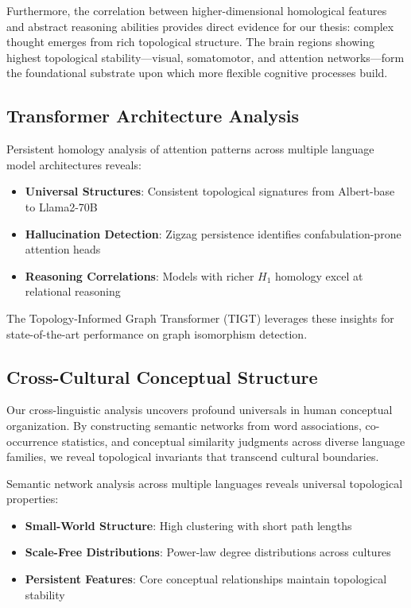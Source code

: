 \documentclass[11pt]{article}
\begin{document}
Furthermore, the correlation between higher-dimensional homological features and abstract reasoning abilities provides direct evidence for our thesis: complex thought emerges from rich topological structure. The brain regions showing highest topological stability—visual, somatomotor, and attention networks—form the foundational substrate upon which more flexible cognitive processes build.

\subsection{Transformer Architecture Analysis}

Persistent homology analysis of attention patterns across multiple language model architectures reveals:

\begin{itemize}
\item \textbf{Universal Structures}: Consistent topological signatures from Albert-base to Llama2-70B
\item \textbf{Hallucination Detection}: Zigzag persistence identifies confabulation-prone attention heads
\item \textbf{Reasoning Correlations}: Models with richer $H_1$ homology excel at relational reasoning
\end{itemize}

The Topology-Informed Graph Transformer (TIGT) leverages these insights for state-of-the-art performance on graph isomorphism detection.

\subsection{Cross-Cultural Conceptual Structure}

Our cross-linguistic analysis uncovers profound universals in human conceptual organization. By constructing semantic networks from word associations, co-occurrence statistics, and conceptual similarity judgments across diverse language families, we reveal topological invariants that transcend cultural boundaries.

Semantic network analysis across multiple languages reveals universal topological properties:

\begin{itemize}
\item \textbf{Small-World Structure}: High clustering with short path lengths
\item \textbf{Scale-Free Distributions}: Power-law degree distributions across cultures
\item \textbf{Persistent Features}: Core conceptual relationships maintain topological stability
\end{itemize}
\end{document}
